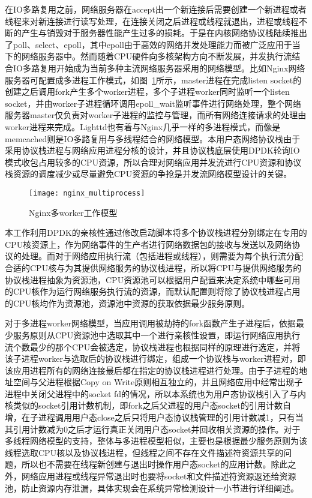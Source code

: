 在IO多路复用之前，网络服务器在accept出一个新连接后需要创建一个新进程或者线程来对新连接进行读写处理，在连接关闭之后进程或线程就退出，进程或线程不断的产生与销毁对于服务器性能产生过多的损耗。于是在内核网络协议栈陆续推出了poll、select、epoll，其中epoll由于高效的网络并发处理能力而被广泛应用于当下的网络服务器中。然而随着CPU硬件向多核架构方向不断发展，并发执行流结合IO多路复用开始成为当前多种主流网络服务器采用的网络模型。比如Nginx网络服务器可配置成多进程工作模式，如图~\ref{fig:nginx_multiprocess}所示，master进程在完成listen socket的创建之后调用fork产生多个worker进程，多个子进程worker同时监听一个listen socket，并由worker子进程循环调用epoll\_wait监听事件进行网络处理，整个网络服务器master仅负责对worker子进程的监控与管理，而所有网络连接请求的处理由worker进程来完成。Lighttd也有着与Nginx几乎一样的多进程模式，而像是memcached则是IO多路复用与多线程结合的网络模型。本用户态网络协议栈由于采用协议栈进程与网络应用进程分核的设计，并且协议栈底层使用DPDK轮询IO模式收包占用较多的CPU资源，所以合理对网络应用并发流进行CPU资源和协议栈资源的调度减少或尽量避免CPU资源的争抢是并发流网络模型设计的关键。

\vspace{-10pt}
\begin{figure}[H] %
  \centering
  \texttt{[image: nginx\_multiprocess]}
  \caption{Nginx多worker工作模型}
  \label{fig:nginx_multiprocess}
\end{figure}
\vspace{-10pt}

本工作利用DPDK的亲核性通过修改启动脚本将多个协议栈进程分别绑定在专用的CPU核资源上，作为网络事件的生产者进行网络数据包的接收与发送以及网络协议的处理。而对于网络应用执行流（包括进程或线程），则需要为每个执行流分配合适的CPU核与为其提供网络服务的协议栈进程，所以将CPU与提供网络服务的协议栈进程抽象为资源池，CPU资源池可以根据用户配置来决定系统中哪些可用的CPU核作为运行网络服务执行流的资源，而默认配置则将除了协议栈进程占用的CPU核均作为资源池，资源池中资源的获取依据最少服务原则。

对于多进程worker网络模型，当应用调用被劫持的fork函数产生子进程后，依据最少服务原则从CPU资源池中选取其中一个进行亲核性设置，即运行网络应用执行流个数最少的那个CPU会被选定，协议栈进程也根据同样的原理进行选定，并将该子进程worker与选取后的协议栈进行绑定，组成一个协议栈与worker进程对，即该应用进程所有的网络连接最后都在指定的协议栈进程进行处理。由于子进程的地址空间与父进程根据Copy on Write原则相互独立的，并且网络应用中经常出现子进程中关闭父进程中的socket fd的情况，所以本系统也为用户态协议栈引入了与内核类似的socket引用计数机制，即fork之后父进程的用户态socket的引用计数自增，在子进程调用用户态close之后只将用户态协议栈管理的引用计数减1，只有当其引用计数减为0之后才运行真正关闭用户态socket并回收相关资源的操作。对于多线程网络模型的支持，整体与多进程模型相似，主要也是根据最少服务原则为该线程选取CPU核以及协议栈进程，但线程之间不存在文件描述符资源共享的问题，所以也不需要在线程新创建与退出时操作用户态socket的应用计数。除此之外，网络应用进程或线程异常退出时也要将socket和文件描述符资源返还给资源池，防止资源内存泄漏，具体实现会在系统异常检测设计一小节进行详细阐述。

